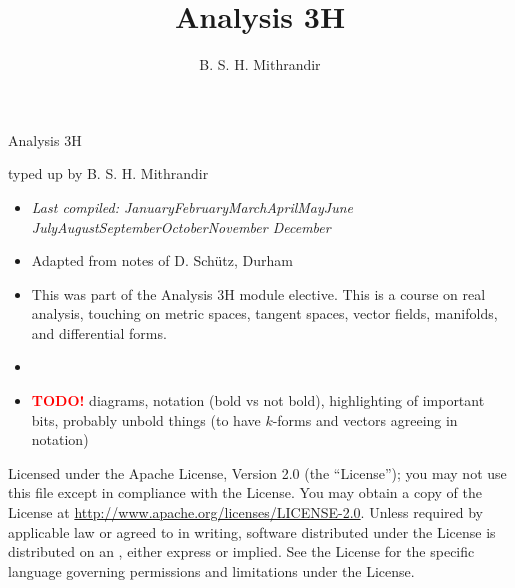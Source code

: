 \documentclass[letter-paper]{tufte-book}
\title{Analysis 3H}
\author[]{B. S. H. Mithrandir}
\newcommand{\monthyear}{%
  \ifcase\month\or January\or February\or March\or April\or May\or June\or
  July\or August\or September\or October\or November\or
  December\fi\space\number\year
}
\newcommand{\TODO}{\textcolor{red}{\bf TODO!}\xspace}
\begin{document}



\chapter*{}

\begin{fullwidth}

\par \begin{center}{\Huge Analysis 3H}\end{center}

\vspace*{5mm}

\par \begin{center}{\Large typed up by B. S. H. Mithrandir}\end{center}

\vspace*{5mm}

\begin{itemize}
  \item \textit{Last compiled: \monthyear}
  \item Adapted from notes of D. Sch\"utz, Durham
  \item This was part of the Analysis 3H module elective. This is a course on
  real analysis, touching on metric spaces, tangent spaces, vector fields,
  manifolds, and differential forms.
  \item[]
  \item \TODO diagrams, notation (bold vs not bold), highlighting of important bits, probably unbold things (to have $k$-forms and vectors agreeing in notation)
\end{itemize}

\par

\par Licensed under the Apache License, Version 2.0 (the ``License''); you may not
use this file except in compliance with the License. You may obtain a copy
of the License at \url{http://www.apache.org/licenses/LICENSE-2.0}. Unless
required by applicable law or agreed to in writing, software distributed
under the License is distributed on an , either express or implied. See the
License for the specific language governing permissions and limitations
under the License.
\end{fullwidth}
\end{document}
